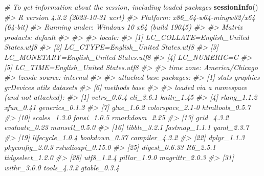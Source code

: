 \documentclass[
]{book}
\newenvironment{Shaded}{\begin{snugshade}}{\end{snugshade}}
\newcommand{\CommentTok}[1]{\textcolor[rgb]{0.56,0.35,0.01}{\textit{#1}}}
\newcommand{\FunctionTok}[1]{\textcolor[rgb]{0.13,0.29,0.53}{\textbf{#1}}}
\newcommand{\NormalTok}[1]{#1}
\begin{document}
\begin{Shaded}
\begin{Highlighting}[]
\CommentTok{\# To get information about the session, including loaded packages}
\FunctionTok{sessionInfo}\NormalTok{()}
\CommentTok{\#\textgreater{} R version 4.3.2 (2023{-}10{-}31 ucrt)}
\CommentTok{\#\textgreater{} Platform: x86\_64{-}w64{-}mingw32/x64 (64{-}bit)}
\CommentTok{\#\textgreater{} Running under: Windows 10 x64 (build 19045)}
\CommentTok{\#\textgreater{} }
\CommentTok{\#\textgreater{} Matrix products: default}
\CommentTok{\#\textgreater{} }
\CommentTok{\#\textgreater{} }
\CommentTok{\#\textgreater{} locale:}
\CommentTok{\#\textgreater{} [1] LC\_COLLATE=English\_United States.utf8 }
\CommentTok{\#\textgreater{} [2] LC\_CTYPE=English\_United States.utf8   }
\CommentTok{\#\textgreater{} [3] LC\_MONETARY=English\_United States.utf8}
\CommentTok{\#\textgreater{} [4] LC\_NUMERIC=C                          }
\CommentTok{\#\textgreater{} [5] LC\_TIME=English\_United States.utf8    }
\CommentTok{\#\textgreater{} }
\CommentTok{\#\textgreater{} time zone: America/Chicago}
\CommentTok{\#\textgreater{} tzcode source: internal}
\CommentTok{\#\textgreater{} }
\CommentTok{\#\textgreater{} attached base packages:}
\CommentTok{\#\textgreater{} [1] stats     graphics  grDevices utils     datasets }
\CommentTok{\#\textgreater{} [6] methods   base     }
\CommentTok{\#\textgreater{} }
\CommentTok{\#\textgreater{} loaded via a namespace (and not attached):}
\CommentTok{\#\textgreater{}  [1] vctrs\_0.6.4       cli\_3.6.1         knitr\_1.45       }
\CommentTok{\#\textgreater{}  [4] rlang\_1.1.2       xfun\_0.41         generics\_0.1.3   }
\CommentTok{\#\textgreater{}  [7] glue\_1.6.2        colorspace\_2.1{-}0  htmltools\_0.5.7  }
\CommentTok{\#\textgreater{} [10] scales\_1.3.0      fansi\_1.0.5       rmarkdown\_2.25   }
\CommentTok{\#\textgreater{} [13] grid\_4.3.2        evaluate\_0.23     munsell\_0.5.0    }
\CommentTok{\#\textgreater{} [16] tibble\_3.2.1      fastmap\_1.1.1     yaml\_2.3.7       }
\CommentTok{\#\textgreater{} [19] lifecycle\_1.0.4   bookdown\_0.37     compiler\_4.3.2   }
\CommentTok{\#\textgreater{} [22] dplyr\_1.1.3       pkgconfig\_2.0.3   rstudioapi\_0.15.0}
\CommentTok{\#\textgreater{} [25] digest\_0.6.33     R6\_2.5.1          tidyselect\_1.2.0 }
\CommentTok{\#\textgreater{} [28] utf8\_1.2.4        pillar\_1.9.0      magrittr\_2.0.3   }
\CommentTok{\#\textgreater{} [31] withr\_3.0.0       tools\_4.3.2       gtable\_0.3.4}
\end{Highlighting}
\end{Shaded}
\end{document}
